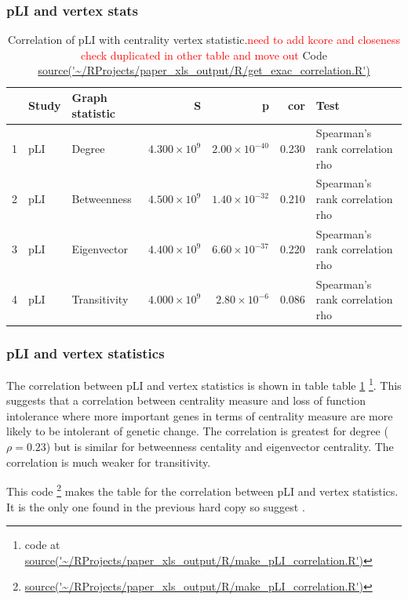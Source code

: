 \subsubsection{pLI and vertex stats}
\begin{table}[ht]
\centering
\begin{tabular}{rllrrrl}
  \hline
 & Study & Graph statistic & S & p & cor & Test \\ 
  \hline
1 & pLI & Degree & $4.300 \times 10^{9}$ & $2.00 \times 10^{-40}$ & 0.230 & Spearman's rank correlation rho \\ 
  2 & pLI & Betweenness & $4.500 \times 10^{9}$ & $1.40 \times 10^{-32}$ & 0.210 & Spearman's rank correlation rho \\ 
  3 & pLI & Eigenvector & $4.400 \times 10^{9}$ & $6.60 \times 10^{-37}$ & 0.220 & Spearman's rank correlation rho \\ 
  4 & pLI & Transitivity & $4.000 \times 10^{9}$ & $2.80 \times 10^{-6}$ & 0.086 & Spearman's rank correlation rho \\ 
   \hline
\end{tabular}
\caption{Correlation of pLI with centrality vertex statistic.\textcolor{red}{need to add kcore and closeness check duplicated in other table and move out} Code \url{source('~/RProjects/paper_xls_output/R/get_exac_correlation.R')}} 
\label{Table:Correlation of pLI with centrality vertex statistic}
\end{table}





\subsubsection{pLI and vertex statistics}
 The   correlation between pLI and vertex statistics is shown in table table \ref{Table:Correlation of pLI with centrality vertex statistic} \footnote{ code at \url{source('~/RProjects/paper_xls_output/R/make_pLI_correlation.R')}}. This suggests that a correlation between centrality measure and loss of function intolerance where more important genes in terms of centrality measure are more likely to be intolerant of genetic change. The correlation is greatest for degree ($\rho = 0.23$) but is similar for betweenness centality and eigenvector centrality. The correlation is much weaker for transitivity. 
 
 
 This code \footnote{\url{source('~/RProjects/paper_xls_output/R/make_pLI_correlation.R')}}
makes the table for the correlation between pLI and vertex statistics. It is the only one found in the previous hard copy so suggest .

